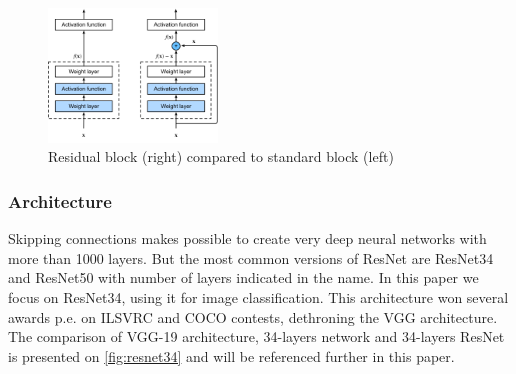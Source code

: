 \documentclass[../Main.tex]{subfiles}
\begin{document}
    \begin{figure}[H]
        \centering
        \includegraphics[width=0.4\textwidth]{Images/02_resnet_compared.png}
        \caption{Residual block (right) compared to standard block (left) \cite{d2l-ai}}
        \label{fig:resnet-compared}
    \end{figure}

    \subsubsection{Architecture}
    Skipping connections makes possible to create very deep neural networks with more than 1000 layers. But the most common versions of ResNet are ResNet34 and ResNet50 with number of layers indicated in the name. In this paper we focus on ResNet34, using it for image classification. This architecture won several awards p.e. on ILSVRC and COCO contests, dethroning the VGG architecture. The comparison of VGG-19 architecture, 34-layers network and 34-layers ResNet is presented on \ref{fig:resnet34} and will be referenced further in this paper. 
    
\end{document}
